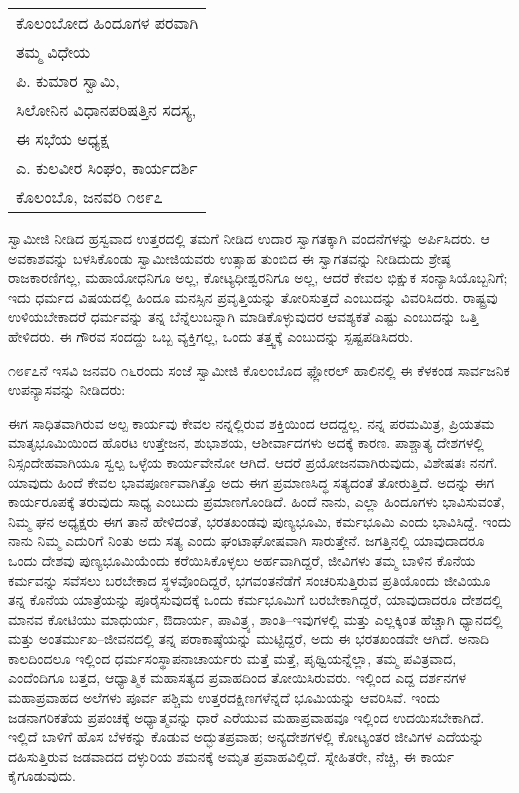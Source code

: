 \vskip 2pt

\begin{longtable}[r]{@{}l@{}}
ಕೊಲಂಬೋದ ಹಿಂದೂಗಳ ಪರವಾಗಿ \\
ತಮ್ಮ ವಿಧೇಯ \\
ಪಿ. ಕುಮಾರ ಸ್ವಾಮಿ, \\
ಸಿಲೋನಿನ ವಿಧಾನಪರಿಷತ್ತಿನ ಸದಸ್ಯ, \\
ಈ ಸಭೆಯ ಅಧ್ಯಕ್ಷ \\
ಎ. ಕುಲವೀರ ಸಿಂಘಂ, ಕಾರ್ಯದರ್ಶಿ \\
ಕೊಲಂಬೊ, ಜನವರಿ ೧೮೯೭ \\
\end{longtable}

\vskip 4pt

ಸ್ವಾಮೀಜಿ ನೀಡಿದ ಹ್ರಸ್ವವಾದ ಉತ್ತರದಲ್ಲಿ ತಮಗೆ ನೀಡಿದ ಉದಾರ ಸ್ವಾಗತಕ್ಕಾಗಿ ವಂದನೆಗಳನ್ನು ಅರ್ಪಿಸಿದರು. ಆ ಅವಕಾಶವನ್ನು ಬಳಸಿಕೊಂಡು ಸ್ವಾಮೀಜಿಯವರು ಉತ್ಸಾಹ ತುಂಬಿದ ಈ ಸ್ವಾಗತವನ್ನು ನೀಡಿದುದು ಶ್ರೇಷ್ಠ ರಾಜಕಾರಣಿಗಲ್ಲ, ಮಹಾಯೋಧನಿಗೂ ಅಲ್ಲ, ಕೋಟ್ಯಧೀಶ್ವರನಿಗೂ ಅಲ್ಲ, ಆದರೆ ಕೇವಲ ಭಿಕ್ಷುಕ ಸಂನ್ಯಾಸಿಯೊಬ್ಬನಿಗೆ; ಇದು ಧರ್ಮದ ವಿಷಯದಲ್ಲಿ ಹಿಂದೂ ಮನಸ್ಸಿನ ಪ್ರವೃತ್ತಿಯನ್ನು ತೋರಿಸುತ್ತದೆ ಎಂಬುದನ್ನು ವಿವರಿಸಿದರು. ರಾಷ್ಟ್ರವು ಉಳಿಯಬೇಕಾದರೆ ಧರ್ಮವನ್ನು ತನ್ನ ಬೆನ್ನೆಲುಬನ್ನಾಗಿ ಮಾಡಿಕೊಳ್ಳುವುದರ ಆವಶ್ಯಕತೆ ಎಷ್ಟು ಎಂಬುದನ್ನು ಒತ್ತಿ ಹೇಳಿದರು. ಈ ಗೌರವ ಸಂದದ್ದು ಒಬ್ಬ ವ್ಯಕ್ತಿಗಲ್ಲ, ಒಂದು ತತ್ತ್ವಕ್ಕೆ ಎಂಬುದನ್ನು ಸ್ಪಷ್ಟಪಡಿಸಿದರು.

೧೮೯೭ನೆ ಇಸವಿ ಜನವರಿ ೧೬ರಂದು ಸಂಜೆ ಸ್ವಾಮೀಜಿ ಕೊಲಂಬೊದ ಫ್ಲೋರಲ್​ ಹಾಲಿನಲ್ಲಿ ಈ ಕೆಳಕಂಡ ಸಾರ್ವಜನಿಕ ಉಪನ್ಯಾಸವನ್ನು ನೀಡಿದರು:

ಈಗ ಸಾಧಿತವಾಗಿರುವ ಅಲ್ಪ ಕಾರ್ಯವು ಕೇವಲ ನನ್ನಲ್ಲಿರುವ ಶಕ್ತಿಯಿಂದ ಆದದ್ದಲ್ಲ. ನನ್ನ ಪರಮಮಿತ್ರ, ಪ್ರಿಯತಮ ಮಾತೃಭೂಮಿಯಿಂದ ಹೊರಟ ಉತ್ತೇಜನ, ಶುಭಾಶಯ, ಆಶೀರ್ವಾದಗಳು ಅದಕ್ಕೆ ಕಾರಣ. ಪಾಶ್ಚಾತ್ಯ ದೇಶಗಳಲ್ಲಿ ನಿಸ್ಸಂದೇಹವಾಗಿಯೂ ಸ್ವಲ್ಪ ಒಳ್ಳೆಯ ಕಾರ್ಯವೇನೋ ಆಗಿದೆ. ಆದರೆ ಪ್ರಯೋಜನವಾಗಿರುವುದು, ವಿಶೇಷತಃ ನನಗೆ. ಯಾವುದು ಹಿಂದೆ ಕೇವಲ ಭಾವಪೂರ್ಣವಾಗಿತ್ತೊ ಅದು ಈಗ ಪ್ರಮಾಣಸಿದ್ಧ ಸತ್ಯದಂತೆ ತೋರುತ್ತಿದೆ. ಅದನ್ನು ಈಗ ಕಾರ್ಯರೂಪಕ್ಕೆ ತರುವುದು ಸಾಧ್ಯ ಎಂಬುದು ಪ್ರಮಾಣಗೊಂಡಿದೆ. ಹಿಂದೆ ನಾನು, ಎಲ್ಲಾ ಹಿಂದೂಗಳು ಭಾವಿಸುವಂತೆ, ನಿಮ್ಮ ಘನ ಅಧ್ಯಕ್ಷರು ಈಗ ತಾನೆ ಹೇಳಿದಂತೆ, ಭರತಖಂಡವು ಪುಣ್ಯಭೂಮಿ, ಕರ್ಮಭೂಮಿ ಎಂದು ಭಾವಿಸಿದ್ದೆ. ಇಂದು ನಾನು ನಿಮ್ಮ ಎದುರಿಗೆ ನಿಂತು ಅದು ಸತ್ಯ ಎಂದು ಘಂಟಾಘೋಷವಾಗಿ ಸಾರುತ್ತೇನೆ. ಜಗತ್ತಿನಲ್ಲಿ ಯಾವುದಾದರೂ ಒಂದು ದೇಶವು ಪುಣ್ಯಭೂಮಿಯೆಂದು ಕರೆಯಿಸಿಕೊಳ್ಳಲು ಅರ್ಹವಾಗಿದ್ದರೆ, ಜೀವಿಗಳು ತಮ್ಮ ಬಾಳಿನ ಕೊನೆಯ ಕರ್ಮವನ್ನು ಸವೆಸಲು ಬರಬೇಕಾದ ಸ್ಥಳವೊಂದಿದ್ದರೆ, ಭಗವಂತನೆಡೆಗೆ ಸಂಚರಿಸುತ್ತಿರುವ ಪ್ರತಿಯೊಂದು ಜೀವಿಯೂ ತನ್ನ ಕೊನೆಯ ಯಾತ್ರೆಯನ್ನು ಪೂರೈಸುವುದಕ್ಕೆ ಒಂದು ಕರ್ಮಭೂಮಿಗೆ ಬರಬೇಕಾಗಿದ್ದರೆ, ಯಾವುದಾದರೂ ದೇಶದಲ್ಲಿ ಮಾನವ ಕೋಟಿಯು ಮಾಧುರ್ಯ, ಔದಾರ್ಯ, ಪಾವಿತ್ರ್ಯ, ಶಾಂತಿ–ಇವುಗಳಲ್ಲಿ ಮತ್ತು ಎಲ್ಲಕ್ಕಿಂತ ಹೆಚ್ಚಾಗಿ ಧ್ಯಾನದಲ್ಲಿ ಮತ್ತು ಅಂತರ್ಮುಖ–ಜೀವನದಲ್ಲಿ ತನ್ನ ಪರಾಕಾಷ್ಠೆಯನ್ನು ಮುಟ್ಟಿದ್ದರೆ, ಅದು ಈ ಭರತಖಂಡವೇ ಆಗಿದೆ. ಅನಾದಿ ಕಾಲದಿಂದಲೂ ಇಲ್ಲಿಂದ ಧರ್ಮಸಂಸ್ಥಾಪನಾಚಾರ್ಯರು ಮತ್ತೆ ಮತ್ತೆ, ಪೃಥ್ವಿಯನ್ನೆಲ್ಲಾ, ತಮ್ಮ ಪವಿತ್ರವಾದ, ಎಂದೆಂದಿಗೂ ಬತ್ತದ, ಆಧ್ಯಾತ್ಮಿಕ ಮಹಾಸತ್ಯದ ಪ್ರವಾಹದಿಂದ ತೋಯಿಸಿರುವರು. ಇಲ್ಲಿಂದ ಎದ್ದ ದರ್ಶನಗಳ ಮಹಾಪ್ರವಾಹದ ಅಲೆಗಳು ಪೂರ್ವ ಪಶ್ಚಿಮ ಉತ್ತರ\break ದಕ್ಷಿಣಗಳೆನ್ನದೆ ಭೂಮಿಯನ್ನು ಆವರಿಸಿವೆ. ಇಂದು ಜಡನಾಗರಿಕತೆಯ ಪ್ರಪಂಚಕ್ಕೆ ಅಧ್ಯಾತ್ಮವನ್ನು ಧಾರೆ ಎರೆಯುವ ಮಹಾಪ್ರವಾಹವೂ ಇಲ್ಲಿಂದ ಉದಯಿಸಬೇಕಾಗಿದೆ. ಇಲ್ಲಿದೆ ಬಾಳಿಗೆ ಹೊಸ ಬೆಳಕನ್ನು ಕೊಡುವ ಅದ್ಭುತಪ್ರವಾಹ; ಅನ್ಯದೇಶಗಳಲ್ಲಿ ಕೋಟ್ಯಂತರ ಜೀವಿಗಳ ಎದೆಯನ್ನು ದಹಿಸುತ್ತಿರುವ ಜಡವಾದದ ದಳ್ಳುರಿಯ ಶಮನಕ್ಕೆ ಅಮೃತ ಪ್ರವಾಹವಿಲ್ಲಿದೆ. ಸ್ನೇಹಿತರೇ, ನೆಚ್ಚಿ, ಈ ಕಾರ್ಯ ಕೈಗೂಡುವುದು.


